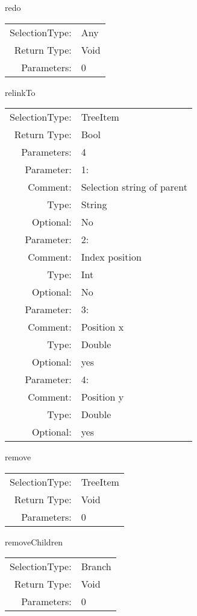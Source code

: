 \item redo\\
\begin{tabular}{rl}
  SelectionType: & Any\\
    Return Type: & Void\\
     Parameters: & 0\\
\end{tabular}

\item relinkTo\\
\begin{tabular}{rl}
  SelectionType: & TreeItem\\
    Return Type: & Bool\\
     Parameters: & 4\\
   Parameter: &  1:\\
        Comment: & Selection string of parent\\
           Type: & String\\
       Optional: &  No\\
   Parameter: &  2:\\
        Comment: & Index position\\
           Type: & Int\\
       Optional: &  No\\
   Parameter: &  3:\\
        Comment: & Position x\\
           Type: & Double\\
       Optional: &  yes\\
   Parameter: &  4:\\
        Comment: & Position y\\
           Type: & Double\\
       Optional: &  yes\\
\end{tabular}

\item remove\\
\begin{tabular}{rl}
  SelectionType: & TreeItem\\
    Return Type: & Void\\
     Parameters: & 0\\
\end{tabular}

\item removeChildren\\
\begin{tabular}{rl}
  SelectionType: & Branch\\
    Return Type: & Void\\
     Parameters: & 0\\
\end{tabular}

